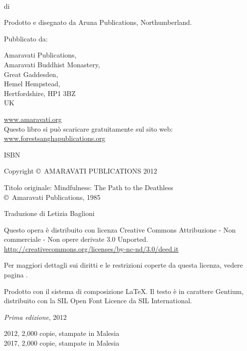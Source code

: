 {\small\setlength{\parskip}{0.8em}\setlength{\parindent}{0em}%
{\raggedright%

\enlargethispage*{\baselineskip}

\thetitle\\
di \theauthor

Prodotto e disegnato da Aruna Publications, Northumberland.

Pubblicato da:

Amaravati Publications,\\
Amaravati Buddhist Monastery,\\
Great Gaddesden, \\
Hemel Hempstead, \\
Hertfordshire, HP1 3BZ\\
UK

\href{http://amaravati.org}{www.amaravati.org}\\

Questo libro si può scaricare gratuitamente sul sito web:\\
\href{http://forestsanghapublications.org/}{www.forestsanghapublications.org}

ISBN \theISBN

Copyright \copyright\ AMARAVATI PUBLICATIONS 2012


Titolo originale: Mindfulness: The Path to the Deathless\\
\copyright\ Amaravati Publications, 1985

Traduzione di Letizia Baglioni


\vfill

{\footnotesize

Questo opera è distribuito con licenza Creative Commons Attribuzione - Non commerciale - Non opere derivate 3.0 Unported.\\
\href{http://creativecommons.org/licenses/by-nc-nd/3.0/deed.it}{http://creativecommons.org/licenses/by-nc-nd/3.0/deed.it}

Per maggiori dettagli sui diritti e le restrizioni coperte da questa licenza, vedere pagina \pageref{copyright-details}.

Prodotto con il sistema di composizione {\selectfont\LaTeX}. Il testo è in carattere Gentium, distribuito con la SIL Open Font Licence da SIL International.

\textit{Prima edizione}, 2012

2012, 2,000 copie, stampate in Malesia\\
2017, 2,000 copie, stampate in Malesia

}

}}

